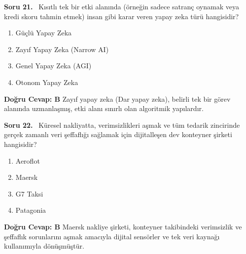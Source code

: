 \documentclass[11pt,a4paper,openany]{book}
\begin{document}
\needspace{5cm}
\vspace{8pt}
\noindent\textbf{\large\sffamily Soru 21.} \ Kısıtlı tek bir etki alanında (örneğin sadece satranç oynamak veya kredi skoru tahmin etmek) insan gibi karar veren yapay zeka türü hangisidir?
\begin{enumerate}[label=\Alph*), leftmargin=25pt, topsep=4pt, itemsep=2pt]
    \item Güçlü Yapay Zeka
    \item Zayıf Yapay Zeka (Narrow AI)
    \item Genel Yapay Zeka (AGI)
    \item Otonom Yapay Zeka
\end{enumerate}
\vspace{4pt}
\begin{tcolorbox}[title=Cevap ve Açıklama, colback=gray!3!white, colframe=primarycolor!90!black, arc=2mm, fonttitle=\bfseries\sffamily, top=6pt, bottom=6pt]
    \textbf{Doğru Cevap: B}
    \vspace{2pt}
    Zayıf yapay zeka (Dar yapay zeka), belirli tek bir görev alanında uzmanlaşmış, etki alanı sınırlı olan algoritmik yapılardır.
\end{tcolorbox}
\vspace{10pt}

\needspace{5cm}
\vspace{8pt}
\noindent\textbf{\large\sffamily Soru 22.} \ Küresel nakliyatta, verimsizlikleri aşmak ve tüm tedarik zincirinde gerçek zamanlı veri şeffaflığı sağlamak için dijitalleşen dev konteyner şirketi hangisidir?
\begin{enumerate}[label=\Alph*), leftmargin=25pt, topsep=4pt, itemsep=2pt]
    \item Aeroflot
    \item Maersk
    \item G7 Taksi
    \item Patagonia
\end{enumerate}
\vspace{4pt}
\begin{tcolorbox}[title=Cevap ve Açıklama, colback=gray!3!white, colframe=primarycolor!90!black, arc=2mm, fonttitle=\bfseries\sffamily, top=6pt, bottom=6pt]
    \textbf{Doğru Cevap: B}
    \vspace{2pt}
    Maersk nakliye şirketi, konteyner takibindeki verimsizlik ve şeffaflık sorunlarını aşmak amacıyla dijital sensörler ve tek veri kaynağı kullanımıyla dönüşmüştür.
\end{tcolorbox}
\vspace{10pt}
\end{document}
